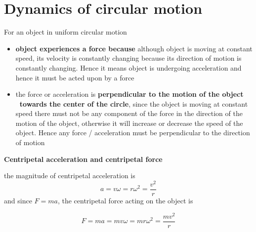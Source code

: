 \documentclass[a4paper, 10pt]{article}
\begin{document}
\section{Dynamics of circular motion}

For an object in uniform circular motion

\begin{itemize}
    \item \textbf{object experiences a force because} although object is moving at constant speed, its velocity is constantly changing because its direction of motion is constantly changing. Hence it means object is undergoing acceleration and hence it must be acted upon by a force \\
    \item the force or acceleration is \textbf{perpendicular to the motion of the object \ towards the center of the circle}, since the object is moving at constant speed there must not be any component of the force in the direction of the motion of the object, otherwise it will increase or decrease the speed of the object. Hence any force / acceleration must be perpendicular to the direction of motion
\end{itemize}

\textbf{Centripetal acceleration and centripetal force}

the magnitude of centripetal acceleration is 
\[
   a = v\omega = r \omega^2 = \frac{v^2}{r}
\]
and since $F = ma$, the centripetal force acting on the object is 

\[
F = ma = mv \omega = mr\omega^2 = \frac{mv^2}{r}
\] 
\end{document}
